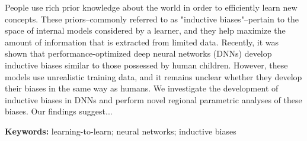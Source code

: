 People use rich prior knowledge about the world in order 
to efficiently learn new concepts. These priors--commonly referred to as
"inductive biases"--pertain to the space of internal models considered by a
learner, and they help maximize the amount of information that is extracted
from limited data. Recently, it was shown that performance-optimized 
deep neural networks (DNNs) develop inductive biases similar to those 
possessed by human children. However, these models use unrealistic training
data, and it remains unclear whether they develop their biases in the same way
as humans. We investigate the development of inductive biases in DNNs and
perform novel regional parametric analyses of these biases. Our findings
suggest...

\textbf{Keywords:}
learning-to-learn; neural networks; inductive biases